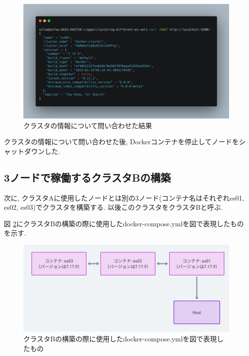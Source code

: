 \begin{figure}
  \begin{center}
    \includegraphics[width=120mm]{sotu/figure/es04-cluster.png}
    \caption{クラスタの情報について問い合わせた結果}
    \label{4-p9}
  \end{center}
\end{figure}

クラスタの情報について問い合わせた後, Dockerコンテナを停止してノードをシャットダウンした.

\subsection{3ノードで稼働するクラスタBの構築}

次に, クラスタAに使用したノードとは別の3ノード(コンテナ名はそれぞれes01, es02, es03)でクラスタを構築する. 以後このクラスタをクラスタBと呼ぶ.

図 \ref{4-p10}にクラスタBの構築の際に使用したdocker-compose.ymlを図で表現したものを示す.

\begin{figure}
  \begin{center}
    \includegraphics[width=120mm]{sotu/figure/all-7.19.9.png}
    \caption{クラスタBの構築の際に使用したdocker-compose.ymlを図で表現したもの}
    \label{4-p10}
  \end{center}
\end{figure}

